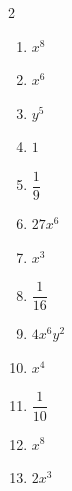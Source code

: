 \documentclass[11pt]{article}
\begin{document}
\begin{keybox}
\begin{multicols}{2}
\small
\begin{enumerate}[leftmargin=*,itemsep=3pt]
  \item $x^8$
  \item $x^6$
  \item $y^5$
  \item $1$
  \item $\dfrac{1}{9}$
  \item $27x^6$
  \item $x^3$
  \item $\dfrac{1}{16}$
  \item $4x^6y^2$
  \item $x^4$
  \item $\dfrac{1}{10}$
  \item $x^8$
  \item $2x^3$
\end{enumerate}
\end{multicols}
\end{keybox}
\end{document}
